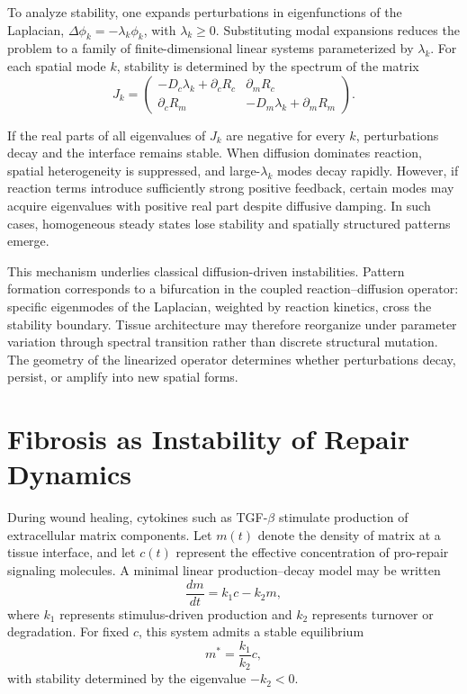 \documentclass[12pt]{book}
\begin{document}
To analyze stability, one expands perturbations in eigenfunctions of
the Laplacian, $\Delta \phi_k = -\lambda_k \phi_k$, with
$\lambda_k \ge 0$. Substituting modal expansions reduces the problem
to a family of finite-dimensional linear systems parameterized by
$\lambda_k$. For each spatial mode $k$, stability is determined by
the spectrum of the matrix
\[
J_k
=
\begin{pmatrix}
- D_c \lambda_k + \partial_c R_c & \partial_m R_c \\
\partial_c R_m & - D_m \lambda_k + \partial_m R_m
\end{pmatrix}.
\]

If the real parts of all eigenvalues of $J_k$ are negative for every
$k$, perturbations decay and the interface remains stable. When
diffusion dominates reaction, spatial heterogeneity is suppressed,
and large-$\lambda_k$ modes decay rapidly. However, if reaction terms
introduce sufficiently strong positive feedback, certain modes may
acquire eigenvalues with positive real part despite diffusive
damping. In such cases, homogeneous steady states lose stability and
spatially structured patterns emerge.

This mechanism underlies classical diffusion-driven instabilities.
Pattern formation corresponds to a bifurcation in the coupled
reaction--diffusion operator: specific eigenmodes of the Laplacian,
weighted by reaction kinetics, cross the stability boundary. Tissue
architecture may therefore reorganize under parameter variation
through spectral transition rather than discrete structural mutation.
The geometry of the linearized operator determines whether
perturbations decay, persist, or amplify into new spatial forms.

\section{Fibrosis as Instability of Repair Dynamics}

During wound healing, cytokines such as TGF-$\beta$ stimulate production
of extracellular matrix components. Let $m(t)$ denote the density of
matrix at a tissue interface, and let $c(t)$ represent the effective
concentration of pro-repair signaling molecules. A minimal linear
production--decay model may be written
\[
\frac{dm}{dt}
=
k_1 c
-
k_2 m,
\]
where $k_1$ represents stimulus-driven production and $k_2$ represents
turnover or degradation. For fixed $c$, this system admits a stable
equilibrium
\[
m^* = \frac{k_1}{k_2} c,
\]
with stability determined by the eigenvalue $-k_2 < 0$.
\end{document}
